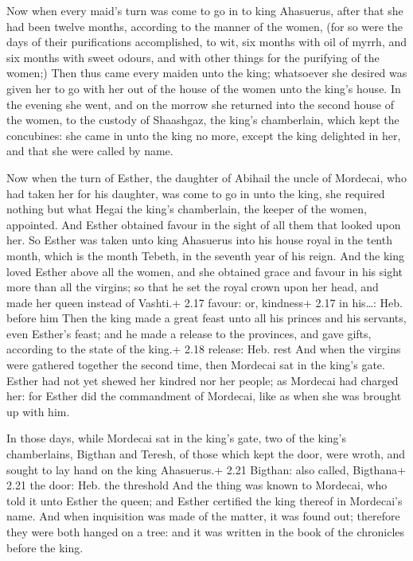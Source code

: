  Now when every maid's turn was come to go in to king
Ahasuerus, after that she had been twelve months, according to the
manner of the women, (for so were the days of their purifications
accomplished, to wit, six months with oil of myrrh, and six months with
sweet odours, and with other things for the purifying of the women;)
 Then thus came every maiden unto the king; whatsoever she
desired was given her to go with her out of the house of the women unto
the king's house.  In the evening she went, and on the
morrow she returned into the second house of the women, to the custody
of Shaashgaz, the king's chamberlain, which kept the concubines: she
came in unto the king no more, except the king delighted in her, and
that she were called by name.

 Now when the turn of Esther, the daughter of Abihail the
uncle of Mordecai, who had taken her for his daughter, was come to go in
unto the king, she required nothing but what Hegai the king's
chamberlain, the keeper of the women, appointed. And Esther obtained
favour in the sight of all them that looked upon her.  So
Esther was taken unto king Ahasuerus into his house royal in the tenth
month, which is the month Tebeth, in the seventh year of his reign.
 And the king loved Esther above all the women, and she
obtained grace and favour in his sight more than all the virgins; so
that he set the royal crown upon her head, and made her queen instead of
Vashti.+ 2.17 favour: or, kindness+ 2.17 in his\ldots: Heb. before him
 Then the king made a great feast unto all his princes and
his servants, even Esther's feast; and he made a release to the
provinces, and gave gifts, according to the state of the king.+ 2.18
release: Heb. rest  And when the virgins were gathered
together the second time, then Mordecai sat in the king's gate.
 Esther had not yet shewed her kindred nor her people; as
Mordecai had charged her: for Esther did the commandment of Mordecai,
like as when she was brought up with him.

 In those days, while Mordecai sat in the king's gate,
two of the king's chamberlains, Bigthan and Teresh, of those which kept
the door, were wroth, and sought to lay hand on the king Ahasuerus.+
2.21 Bigthan: also called, Bigthana+ 2.21 the door: Heb. the threshold
 And the thing was known to Mordecai, who told it unto
Esther the queen; and Esther certified the king thereof in Mordecai's
name.  And when inquisition was made of the matter, it was
found out; therefore they were both hanged on a tree: and it was written
in the book of the chronicles before the king.

